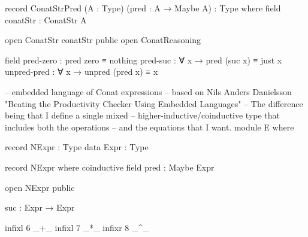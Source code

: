 \begin{code}[hide]
record ConatStrPred (A : Type) (pred : A → Maybe A) : Type where
  field
    conatStr : ConatStr A

  open ConatStr conatStr public
  open ConatReasoning

  field
    pred-zero : pred zero ≡ nothing
    pred-suc : ∀ x → pred (suc x) ≡ just x
    unpred-pred : ∀ x → unpred (pred x) ≡ x

-- embedded language of Conat expressions
-- based on Nils Anders Danielsson "Beating the Productivity Checker Using Embedded Languages"
-- The difference being that I define a single mixed
-- higher-inductive/coinductive type that includes both the operations
-- and the equations that I want.
module E where
\end{code}
\begin{code}
  record NExpr : Type
  data Expr : Type

  record NExpr where
    coinductive
    field pred : Maybe Expr
\end{code}
\begin{code}[hide]
  open NExpr public

  suc : Expr → Expr

  infixl 6 _+_
  infixl 7 _*_
  infixr 8 _^_
\end{code}
